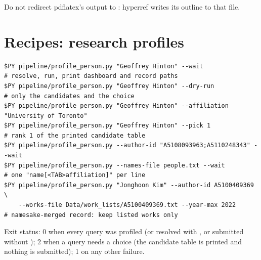 \documentclass[11pt,a4paper]{article}
\newcommand{\file}[1]{\path{#1}}
\begin{document}
\noindent Do not redirect pdflatex's output to \file{<job>.out}: hyperref writes its outline to that file.

\section{Recipes: research profiles}\label{sec:use-profiles}

\begin{Verbatim}
$PY pipeline/profile_person.py "Geoffrey Hinton" --wait                 # resolve, run, print dashboard and record paths
$PY pipeline/profile_person.py "Geoffrey Hinton" --dry-run              # only the candidates and the choice
$PY pipeline/profile_person.py "Geoffrey Hinton" --affiliation "University of Toronto"
$PY pipeline/profile_person.py "Geoffrey Hinton" --pick 1               # rank 1 of the printed candidate table
$PY pipeline/profile_person.py --author-id "A5108093963;A5110248343" --wait
$PY pipeline/profile_person.py --names-file people.txt --wait           # one "name[<TAB>affiliation]" per line
$PY pipeline/profile_person.py "Jonghoon Kim" --author-id A5100409369 \
    --works-file Data/work_lists/A5100409369.txt --year-max 2022        # namesake-merged record: keep listed works only
\end{Verbatim}

\noindent Exit status: 0 when every query was profiled (or resolved with , or submitted without
\code{--wait}); 2 when a query needs a choice (the candidate table is printed and nothing is submitted); 1 on any other
failure.
\end{document}
